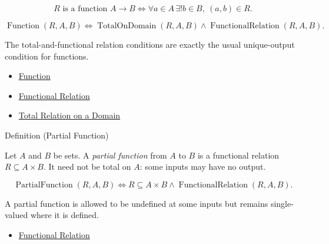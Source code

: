 \begin{remark*}
\[
  R\text{ is a function }A\to B
  \iff
  \forall a\in A\,\exists! b\in B,\ (a,b)\in R.
\]
\end{remark*}

\begin{remark*}
\[
  \operatorname{Function}(R,A,B)
  \iff
  \operatorname{TotalOnDomain}(R,A,B)\wedge
  \operatorname{FunctionalRelation}(R,A,B).
\]
\end{remark*}

\begin{remark*}[Interpretation]
The total-and-functional relation conditions are exactly the usual
unique-output condition for functions.
\end{remark*}

\begin{dependencies}
\begin{itemize}
  \item \hyperref[def:function]{Function}
  \item \hyperref[def:functional-relation]{Functional Relation}
  \item \hyperref[def:total-relation-on-domain]{Total Relation on a Domain}
\end{itemize}
\end{dependencies}

\begin{definitionbox}{Definition (Partial Function)}
\begin{definition}\label{def:partial-function}
Let $A$ and $B$ be sets. A \emph{partial function} from $A$ to $B$ is a
functional relation $R\subseteq A\times B$. It need not be total on $A$:
some inputs may have no output.
\end{definition}
\end{definitionbox}

\begin{remark*}
\[
  \operatorname{PartialFunction}(R,A,B)
  \iff
  R\subseteq A\times B\wedge \operatorname{FunctionalRelation}(R,A,B).
\]
\end{remark*}

\begin{remark*}[Interpretation]
A partial function is allowed to be undefined at some inputs but remains
single-valued where it is defined.
\end{remark*}

\begin{dependencies}
\begin{itemize}
  \item \hyperref[def:functional-relation]{Functional Relation}
\end{itemize}
\end{dependencies}

